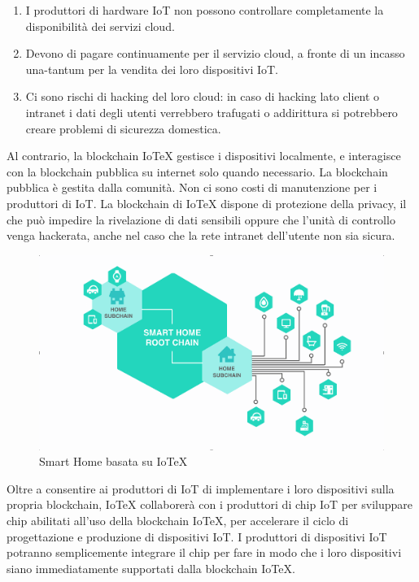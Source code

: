 \begin{enumerate}
    \item I produttori di hardware IoT non possono controllare completamente la disponibilità dei servizi cloud.

    \item Devono di pagare continuamente per il servizio cloud, a fronte di un incasso una-tantum per la vendita dei loro dispositivi IoT.

    \item Ci sono rischi di hacking del loro cloud: in caso di hacking lato client o intranet i dati degli utenti verrebbero trafugati o addirittura si potrebbero creare problemi di sicurezza domestica.
\end{enumerate}

Al contrario, la blockchain IoTeX gestisce i dispositivi localmente, e interagisce con la blockchain pubblica su internet solo quando necessario. La blockchain pubblica è gestita dalla comunità. Non ci sono costi di manutenzione per i produttori di IoT. La blockchain di IoTeX dispone di protezione della privacy, il che può impedire la rivelazione di dati sensibili oppure che l'unità di controllo venga hackerata, anche nel caso che la rete intranet dell'utente non sia sicura.

\begin{figure}
    \centering
    \includegraphics[width=\textwidth]{Figura8}
    \caption{Smart Home basata su IoTeX}
    \label{fig:Figura8}
\end{figure}

Oltre a consentire ai produttori di IoT di implementare i loro dispositivi sulla propria blockchain, IoTeX collaborerà con i produttori di chip IoT per sviluppare chip abilitati all'uso della blockchain IoTeX, per accelerare il ciclo di progettazione e produzione di dispositivi IoT. I produttori di dispositivi IoT potranno semplicemente integrare il chip per fare in modo che i loro dispositivi siano immediatamente supportati dalla blockchain IoTeX.



